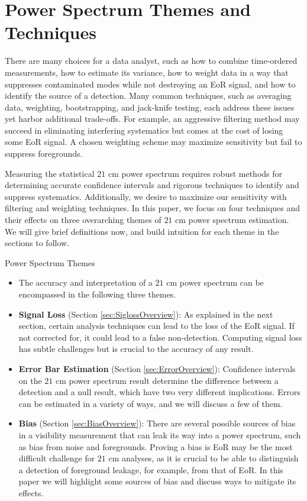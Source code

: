 \documentclass[preprint2,numberedappendix,tighten,twocolappendix]{aastex6}  %
\begin{document}
\section{Power Spectrum Themes and Techniques}
\label{sec:Themes}

There are many choices for a data analyst, such as how to combine time-ordered measurements, how to estimate its variance, how to weight data in a way that suppresses contaminated modes while not destroying an EoR signal, and how to identify the source of a detection. Many common techniques, such as averaging data, weighting, bootstrapping, and jack-knife testing, each address these issues yet harbor additional trade-offs. For example, an aggressive filtering method may succeed in eliminating interfering systematics but comes at the cost of losing some EoR signal. A chosen weighting scheme may maximize sensitivity but fail to suppress foregrounds.

Measuring the statistical $21$ cm power spectrum requires robust methods for determining accurate confidence intervals and rigorous techniques to identify and suppress systematics. Additionally, we desire to maximize our sensitivity with filtering and weighting techniques. In this paper, we focus on four techniques and their effects on three overarching themes of $21$ cm power spectrum estimation. We will give brief definitions now, and build intuition for each theme in the sections to follow.

\begin{center}
Power Spectrum Themes
\end{center}
\begin{itemize}
\item[] The accuracy and interpretation of a $21$ cm power spectrum can be encompassed in the following three themes.
\item \textbf{Signal Loss} (Section \ref{sec:SiglossOverview}): As explained in the next section, certain analysis techniques can lead to the loss of the EoR signal. If not corrected for, it could lead to a false non-detection. Computing signal loss has subtle challenges but is crucial to the accuracy of any result.
\item \textbf{Error Bar Estimation} (Section \ref{sec:ErrorOverview}): Confidence intervals on the $21$ cm power spectrum result determine the difference between a detection and a null result, which have two very different implications. Errors can be estimated in a variety of ways, and we will discuss a few of them.
\item \textbf{Bias} (Section \ref{sec:BiasOverview}): There are several possible sources of bias in a visibility measurement that can leak its way into a power spectrum, such as bias from noise and foregrounds. Proving a bias is EoR may be the most difficult challenge for $21$ cm analyses, as it is crucial to be able to distinguish a detection of foreground leakage, for example, from that of EoR. In this paper we will highlight some sources of bias and discuss ways to mitigate its effects.
\end{itemize}
\end{document}
